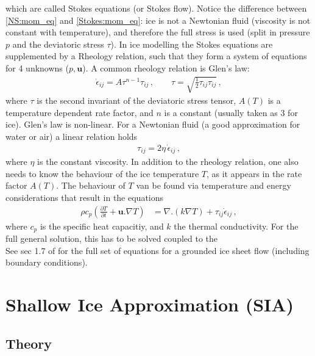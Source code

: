 \documentclass[11pt,a4paper]{article}
\newcommand{\p}{\partial}
\begin{document}
which are called Stokes equations (or Stokes flow). Notice the difference between \eqref{NS:mom_eq} and \eqref{Stokes:mom_eq}: ice is not a Newtonian fluid (viscosity is not constant with temperature), and therefore the full stress is used (split in pressure $p$ and the deviatoric stress $\tau$).
In ice modelling the Stokes equations are supplemented by a Rheology relation, such that they form a system of equations for 4 unknowns ($p, \mathbf{u}$). A common rheology relation is Glen's law:
\begin{align}
    \dot{\epsilon}_{ij} = A \tau^{n-1} \tau_{ij} \,,
    \qquad
    \tau = \sqrt{\frac{1}{2} \tau_{ij} \tau_{ij}} \,,
\end{align}
where $\tau$ is the second invariant of the deviatoric stress tensor, $A(T)$ is a temperature dependent rate factor, and $n$ is a constant (usually taken as 3 for ice). Glen's law is non-linear. For a Newtonian fluid (a good approximation for water or air) a linear relation holds
\begin{align}
    \tau_{ij} = 2 \eta \, \dot{\epsilon}_{ij} \,,
\end{align}
where $\eta$ is the constant viscosity. In addition to the rheology relation, one also needs to know the behaviour of the ice temperature $T$, as it appears in the rate factor $A(T)$. The behaviour of $T$ van be found via temperature and energy considerations that result in the equations
\begin{align}
    \rho c_p \left( \frac{\p T}{\p t} + \mathbf{u} . \nabla T \right)
    & = 
    \nabla . \left( k \nabla T \right) + \tau_{ij} \dot{\epsilon}_{ij} \,,
\end{align}
where $c_p$ is the specific heat capacitiy, and $k$ the thermal conductivity. For the full general solution, this has to be solved coupled to the 
\\
See sec 1.7 of \cite{karthaus_notes} for the full set of equations for a grounded ice sheet flow (including boundary conditions).

\section{Shallow Ice Approximation (SIA)}

\subsection{Theory}
\end{document}

